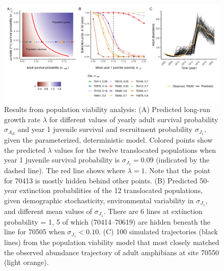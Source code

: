 \documentclass[9pt,twocolumn,twoside,lineno]{pnas-new}
\begin{document}
\begin{figure}

{\centering \includegraphics[width=\textwidth]{figures/pop_viability_figures_for_manuscript.jpg}

}

\caption{\label{fig-viability}Results from population viability
analysis: (A) Predicted long-run growth rate \(\lambda\) for different
values of yearly adult survival probability \(\sigma_{A_R}\) and year 1
juvenile survival and recruitment probability \(\sigma_{J_1}\), given
the parameterized, deterministic model. Colored points show the
predicted \(\lambda\) values for the twelve translocated populations
when year 1 juvenile survival probability is \(\sigma_{J_1} = 0.09\)
(indicated by the dashed line). The red line shows where
\(\lambda = 1\). Note that the point for 70413 is mostly hidden behind
other points. (B) Predicted 50-year extinction probabilities of the 12
translocated populations, given demographic stochasticity, environmental
variability in \(\sigma_{J_1}\), and different mean values of
\(\sigma_{J_1}\). There are 6 lines at extinction probability = 1, 5 of
which (70414--70619) are hidden beneath the line for 70505 when
\(\sigma_{J_1} < 0.10\). (C) 100 simulated trajectories (black lines)
from the population viability model that most closely matched the
observed abundance trajectory of adult amphibians at site 70550 (light
orange).}

\end{figure}

\newpage
\end{document}
